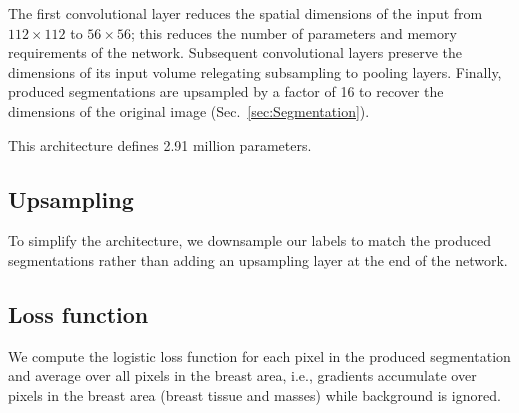 	The first convolutional layer reduces the spatial dimensions of the input from $112 \times 112$ to $56 \times 56$; this reduces the number of parameters and memory requirements of the network. Subsequent convolutional layers preserve the dimensions of its input volume relegating subsampling to pooling layers. 
Finally, produced segmentations are upsampled by a factor of 16 to recover the dimensions of the original image (Sec.~\ref{sec:Segmentation}).

This architecture defines 2.91 million parameters. %



\subsection{Upsampling}
To simplify the architecture, we downsample our labels to match the produced segmentations rather than adding an upsampling layer at the end of the network.

\subsection{Loss function}
We compute the logistic loss function for each pixel in the produced segmentation and average over all pixels in the breast area, i.e., gradients accumulate over pixels in the breast area (breast tissue and masses) while background is ignored.
